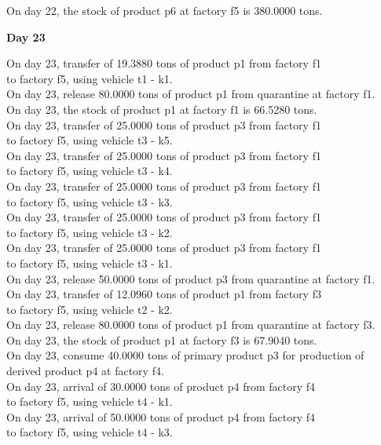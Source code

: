 \begin{table}[H]
\begin{multicols}{2}
\begin{tabbing}
On day 22, the stock of product p6 at factory f5 is 380.0000 tons. \\
\end{tabbing} \vspace{-2.0em}
\textbf{Day 23}
\vspace{-1.6em}
\begin{tabbing}
On day 23, transfer of 19.3880 tons of product p1 from factory f1 \\ to factory f5, using vehicle t1 - k1. \\
On day 23, release 80.0000 tons of product p1 from quarantine at factory f1. \\
On day 23, the stock of product p1 at factory f1 is 66.5280 tons. \\
On day 23, transfer of 25.0000 tons of product p3 from factory f1 \\ to factory f5, using vehicle t3 - k5. \\
On day 23, transfer of 25.0000 tons of product p3 from factory f1 \\ to factory f5, using vehicle t3 - k4. \\
On day 23, transfer of 25.0000 tons of product p3 from factory f1 \\ to factory f5, using vehicle t3 - k3. \\
On day 23, transfer of 25.0000 tons of product p3 from factory f1 \\ to factory f5, using vehicle t3 - k2. \\
On day 23, transfer of 25.0000 tons of product p3 from factory f1 \\ to factory f5, using vehicle t3 - k1. \\
On day 23, release 50.0000 tons of product p3 from quarantine at factory f1. \\
On day 23, transfer of 12.0960 tons of product p1 from factory f3 \\ to factory f5, using vehicle t2 - k2. \\
On day 23, release 80.0000 tons of product p1 from quarantine at factory f3. \\
On day 23, the stock of product p1 at factory f3 is 67.9040 tons. \\
On day 23, consume 40.0000 tons of primary product p3 for production of derived product p4 at factory f4. \\
On day 23, arrival of 30.0000 tons of product p4 from factory f4 \\ to factory f5, using vehicle t4 - k1. \\
On day 23, arrival of 50.0000 tons of product p4 from factory f4 \\ to factory f5, using vehicle t4 - k3. \\

\end{tabbing}
\end{multicols}
\end{table}

